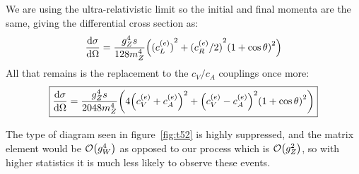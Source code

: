 \documentclass[12pt]{article}
\numberwithin{equation}{section}
\begin{document}
We are using the ultra-relativistic limit so the initial and final momenta are the same, giving the differential cross section as:
\begin{align*}
  \dv{\sigma}{\Omega}=\frac{g_Z^4s}{128m_Z^4}
  \qty({(c_L^{(e)})}^2+{(c_R^{(e)}/2)}^2{(1+\cos\theta)}^2)
\end{align*}
All that remains is the replacement to the $c_V/c_A$ couplings once more:
\begin{equation}
  \label{eq:t55}
  \boxed{
    \dv{\sigma}{\Omega}=\frac{g_Z^4s}{2048m_Z^4}\qty(
    4{\qty(c_V^{(e)}+c_A^{(e)})}^2
    +{\qty(c_V^{(e)}-c_A^{(e)})}^2{(1+\cos\theta)}^2)
  }
\end{equation}

The type of diagram seen in figure~\ref{fig:t52} is highly suppressed, and the matrix element would be $\order{g_W^4}$ as opposed to our process which is $\order{g_Z^2}$, so with higher statistics it is much less likely to observe these events.
\end{document}

